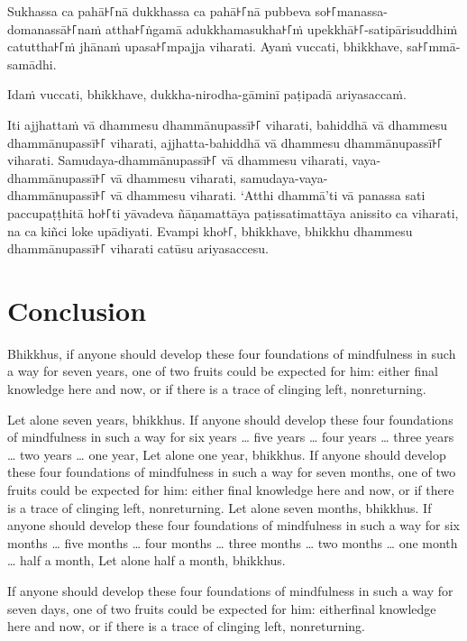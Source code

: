 Sukhassa ca pahā꜔꜒nā dukkhassa ca pahā꜔꜒nā pubbeva so꜔꜒manassa-domanassā꜔꜒naṁ attha꜔꜒ṅgamā
adukkhamasukha꜔꜒ṁ upekkhā꜔꜒-satipārisuddhiṁ catuttha꜔꜒ṁ jhānaṁ upasa꜔꜒mpajja viharati.
Ayaṁ vuccati, bhikkhave, sa꜔꜒mmā-samādhi.

Idaṁ vuccati, bhikkhave, dukkha-nirodha-gāminī paṭipadā ariyasaccaṁ.

Iti ajjhattaṁ vā dhammesu dhammānupassī꜔꜒ viharati,
bahiddhā vā dhammesu dhammānupassī꜔꜒ viharati,
ajjhatta-bahiddhā vā dhammesu dhammānupassī꜔꜒ viharati.
Samudaya-dhammānupassī꜔꜒ vā dhammesu viharati,
vaya-dhammānupassī꜔꜒ vā dhammesu viharati,
samudaya-vaya-\\ dhammānupassī꜔꜒ vā dhammesu viharati.
‘Atthi dhammā’ti vā panassa sati paccupaṭṭhitā ho꜔꜒ti
yāvadeva ñāṇamattāya paṭissatimattāya anissito ca viharati,
na ca kiñci loke upādiyati. Evampi kho꜔꜒, bhikkhave, bhikkhu
dhammesu dhammānupassī꜔꜒ viharati catūsu ariyasaccesu.



\englishPage
\chapter{Conclusion}

Bhikkhus, if anyone should develop these four foundations of mindfulness in
such a way for seven years, one of two fruits could be expected for him: either
final knowledge here and now, or if there is a trace of clinging left,
nonreturning.

Let alone seven years, bhikkhus. If anyone should develop these four
foundations of mindfulness in such a way for six years \ldots{} five years
\ldots{} four years \ldots{} three years \ldots{} two years \ldots{} one year,
Let alone one year, bhikkhus. If anyone should develop these four foundations
of mindfulness in such a way for seven months, one of two fruits could be
expected for him: either final knowledge here and now, or if there is a trace of
clinging left, nonreturning. Let alone seven months, bhikkhus. If anyone should
develop these four foundations of mindfulness in such a way for six months
\ldots{} five months \ldots{} four months \ldots{} three months \ldots{} two
months \ldots{} one month \ldots{} half a month, Let alone half a month,
bhikkhus.

If anyone should develop these four foundations of mindfulness in such a way
for seven days, one of two fruits could be expected for him: eitherfinal
knowledge here and now, or if there is a trace of clinging left, nonreturning.

